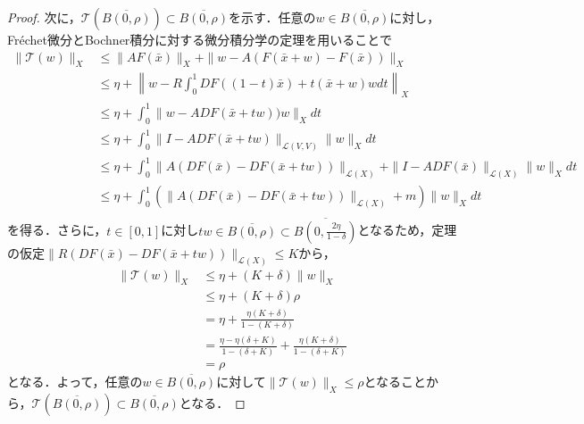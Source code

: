 \documentclass[11pt,a4paper,titlepage]{jsreport}
\theoremstyle{definition}
\begin{document}
\begin{proof}
  次に，$\mathcal{T}(\overline{B(0,\rho)}) \subset \overline{B(0,\rho)}$を示す．任意の$w\in \overline{B(0,\rho)}$に対し，Fr\'{e}chet微分とBochner積分に対する微分積分学の定理を用いることで
  \begin{align*}
    \|\mathcal{T}(w)\|_X & \leq \|AF(\bar{x})\|_X + \|w-A(F(\bar{x}+w)-F(\bar{x}))\|_X                                                             \\
                         & \leq \eta + \left\| w - R\int_0^1 DF((1-t)\bar{x})+t(\bar{x}+w)wdt \right\|_X                                                        \\
                         & \leq \eta + \int_0^1 \|w - ADF(\bar{x}+tw))w\|_X dt                                                                     \\
                         & \leq \eta + \int_0^1 \|I - ADF(\bar{x}+tw)\|_{\mathcal{L}(V,V)}\|w\|_X dt                                               \\
                         & \leq \eta + \int_0^1 \|A(DF(\bar{x})-DF(\bar{x}+tw))\|_{\mathcal{L}(X)} + \|I-ADF(\bar{x})\|_{\mathcal{L}(X)}\|w\|_X dt \\
                         & \leq \eta + \int_0^1 (\|A(DF(\bar{x})-DF(\bar{x}+tw))\|_{\mathcal{L}(X)} +m) \|w\|_{X}dt                                \\
  \end{align*}
  を得る．さらに，$t\in[0,1]$に対し$tw\in\overline{B(0,\rho)}\subset\overline{B\left(0,\frac{2\eta}{1-\delta}\right)}$となるため，定理の仮定$\|R(DF(\bar{x})-DF(\bar{x}+tw))\|_{\mathcal{L}(X)}\leq K$から，
  \begin{align*}
    \|\mathcal{T}(w)\|_X & \leq \eta + (K+\delta)\|w\|_X                                             \\
                         & \leq \eta + (K+\delta)\rho                                                \\
                         & = \eta + \frac{\eta(K+\delta)}{1-(K+\delta)}                              \\
                         & = \frac{\eta-\eta(\delta+K)}{1-(\delta+K)}+\frac{\eta(K+\delta)}{1-(\delta+K)} \\
                         & = \rho
  \end{align*}
  となる．よって，任意の$w\in \overline{B(0,\rho)}$に対して$\|\mathcal{T}(w)\|_X \leq \rho$となることから，$\mathcal{T}\left(\overline{B(0,\rho)}\right) \subset \overline{B(0,\rho)}$となる．


\end{proof}
\end{document}
